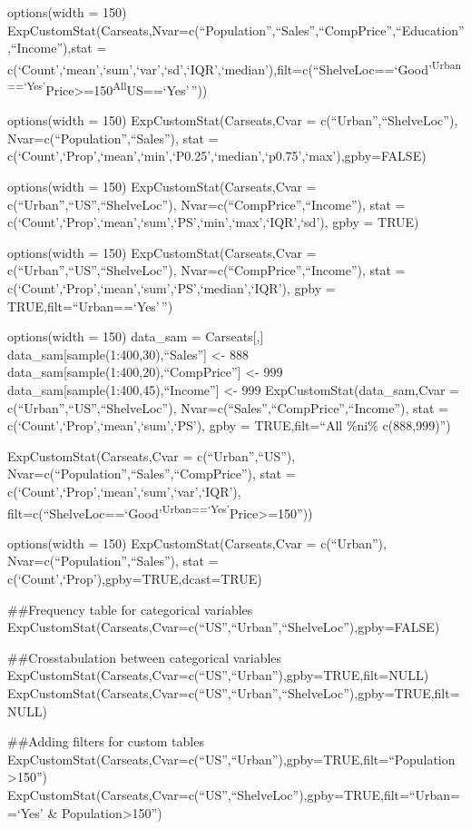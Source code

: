 \documentclass[]{article}
\begin{document}
options(width = 150)
ExpCustomStat(Carseats,Nvar=c(``Population'',``Sales'',``CompPrice'',``Education'',``Income''),stat
=
c(`Count',`mean',`sum',`var',`sd',`IQR',`median'),filt=c(``ShelveLoc==`Good'\textsuperscript{Urban==`Yes'}Price\textgreater=150\textsuperscript{All}US==`Yes'\,''))

options(width = 150) ExpCustomStat(Carseats,Cvar =
c(``Urban'',``ShelveLoc''), Nvar=c(``Population'',``Sales''), stat =
c(`Count',`Prop',`mean',`min',`P0.25',`median',`p0.75',`max'),gpby=FALSE)

options(width = 150) ExpCustomStat(Carseats,Cvar =
c(``Urban'',``US'',``ShelveLoc''), Nvar=c(``CompPrice'',``Income''),
stat = c(`Count',`Prop',`mean',`sum',`PS',`min',`max',`IQR',`sd'), gpby
= TRUE)

options(width = 150) ExpCustomStat(Carseats,Cvar =
c(``Urban'',``US'',``ShelveLoc''), Nvar=c(``CompPrice'',``Income''),
stat = c(`Count',`Prop',`mean',`sum',`PS',`median',`IQR'), gpby =
TRUE,filt=``Urban==`Yes'\,'')

options(width = 150) data\_sam = Carseats{[},{]}
data\_sam{[}sample(1:400,30),``Sales''{]} \textless- 888
data\_sam{[}sample(1:400,20),``CompPrice''{]} \textless- 999
data\_sam{[}sample(1:400,45),``Income''{]} \textless- 999
ExpCustomStat(data\_sam,Cvar = c(``Urban'',``US'',``ShelveLoc''),
Nvar=c(``Sales'',``CompPrice'',``Income''), stat =
c(`Count',`Prop',`mean',`sum',`PS'), gpby = TRUE,filt=``All \%ni\%
c(888,999)'')

ExpCustomStat(Carseats,Cvar = c(``Urban'',``US''),
Nvar=c(``Population'',``Sales'',``CompPrice''), stat =
c(`Count',`Prop',`mean',`sum',`var',`IQR'),
filt=c(``ShelveLoc==`Good'\textsuperscript{Urban==`Yes'}Price\textgreater=150''))

options(width = 150) ExpCustomStat(Carseats,Cvar = c(``Urban''),
Nvar=c(``Population'',``Sales''), stat =
c(`Count',`Prop'),gpby=TRUE,dcast=TRUE)

\#\#Frequency table for categorical variables
ExpCustomStat(Carseats,Cvar=c(``US'',``Urban'',``ShelveLoc''),gpby=FALSE)

\#\#Crosstabulation between categorical variables
ExpCustomStat(Carseats,Cvar=c(``US'',``Urban''),gpby=TRUE,filt=NULL)
ExpCustomStat(Carseats,Cvar=c(``US'',``Urban'',``ShelveLoc''),gpby=TRUE,filt=NULL)

\#\#Adding filters for custom tables
ExpCustomStat(Carseats,Cvar=c(``US'',``Urban''),gpby=TRUE,filt=``Population\textgreater150'')
ExpCustomStat(Carseats,Cvar=c(``US'',``ShelveLoc''),gpby=TRUE,filt=``Urban==`Yes'
\& Population\textgreater150'')
\end{document}
